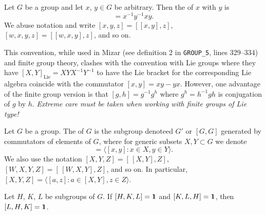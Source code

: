 \begin{definition}
  Let $G$ be a group and let $x$, $y\in G$ be arbitrary.
  Then the  of $x$ with $y$ is
  \begin{equation*}
    [x,y] = x^{-1}y^{-1}xy.
  \end{equation*}
  We abuse notation and write $[x,y,z] = [{[x,y]},z]$,
  $[w,x,y,z] = [{[w,x,y]},z]$, and so on.
\end{definition}

\begin{remark}
This convention, while used in Mizar (see definition 2 in \verb#GROUP_5#,
lines 329--334) and finite group theory, clashes with the convention
with Lie groups where they have $[X,Y]_{\text{Lie}}=XYX^{-1}Y^{-1}$ to
have the Lie bracket for the corresponding Lie algebra coincide with the
commutator $[x,y] = xy - yx$. However, one advantage of the finite group
version is that $[g,h] = g^{-1}g^{h}$ where $g^{h}=h^{-1}gh$ is
conjugation of $g$ by $h$. \emph{Extreme care must be taken when working
with finite groups of Lie type!}
\end{remark}

\begin{definition}
Let $G$ be a group. The  of $G$ is the subgroup
denoteed $G'$ or $[G,G]$ generated by commutators of elements of $G$, where
for generic subsets $X,Y\subset G$ we denote
\begin{equation}
  [X,Y] = \langle [x,y] : x\in X,y\in Y\rangle.
\end{equation}
We also use the notation $[X,Y,Z] = [\,{[X,Y]},Z]$, $[W,X,Y,Z] = [\,{[W,X,Y]},Z]$,
and so on. In particular, $[X,Y,Z] = \langle [a,z] : a\in[X,Y], z\in Z\rangle$.
\end{definition}


\begin{theorem}
  Let $H$, $K$, $L$ be subgroups of $G$.
  If $[H,K,L]=\mathbf{1}$ and $[K,L,H]=\mathbf{1}$,
  then $[L,H,K]=\mathbf{1}$.
\end{theorem}
